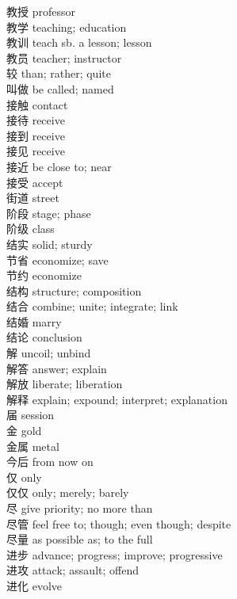 教授 \quad professor\\
教学 \quad teaching; education\\
教训 \quad teach sb. a lesson; lesson\\
教员 \quad teacher; instructor\\
较 \quad than; rather; quite\\
叫做 \quad be called; named\\
接触 \quad contact\\
接待 \quad receive\\
接到 \quad receive\\
接见 \quad receive\\
接近 \quad be close to; near\\
接受 \quad accept\\
街道 \quad street\\
阶段 \quad stage; phase\\
阶级 \quad class\\
结实 \quad solid; sturdy\\
节省 \quad economize; save\\
节约 \quad economize\\
结构 \quad structure; composition\\
结合 \quad combine; unite; integrate; link\\
结婚 \quad marry\\
结论 \quad conclusion\\
解 \quad uncoil; unbind\\
解答 \quad answer; explain\\
解放 \quad liberate; liberation\\
解释 \quad explain; expound; interpret; explanation\\
届 \quad session\\
金 \quad gold\\
金属 \quad metal\\
今后 \quad from now on\\
仅 \quad only\\
仅仅 \quad only; merely; barely\\
尽 \quad give priority; no more than\\
尽管 \quad feel free to; though; even though; despite\\
尽量 \quad as possible as; to the full\\
进步 \quad advance; progress; improve; progressive\\
进攻 \quad attack; assault; offend\\
进化 \quad evolve\\
